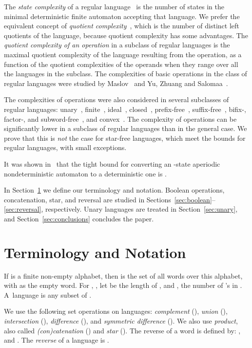 \documentclass{llncs}
\begin{document}
The \emph{state complexity} of a regular language~\cite{Yu01} is the number of states in the minimal deterministic finite automaton accepting that language. We prefer  the equivalent concept of \emph{quotient complexity}~\cite{Brz10}, which is the number of distinct left quotients of the language, because quotient complexity has some advantages.
The \emph{quotient complexity of an operation} in a subclass of regular languages is the maximal quotient complexity of the language resulting from the operation, as a function of the quotient complexities of the operands when they range over all the languages in the subclass. 
The complexities of basic operations in the class of regular languages were studied by Maslov~\cite{Mas70} and Yu, Zhuang and Salomaa~\cite{YZS94}.

The complexities of operations were also considered in several subclasses of regular languages: 
unary~\cite{PiSh02,YZS94}, finite~\cite{CCSY01,Yu01}, ideal~\cite{BJL10}, closed~\cite{BJZ10}, prefix-free~\cite{HSW09},  suffix-free~\cite{HaSa09}, bifix-, factor-, and subword-free~\cite{BJS10},   and convex~\cite{Brz10a}. 
The complexity of operations can be significantly lower 
in a subclass of regular languages than in the general case. 
We prove that this is \emph{not} the case for star-free languages, which meet the bounds for regular languages, with  small exceptions.

It was shown in~\cite{BHK09} that the tight bound for converting an -state aperiodic nondeterministic automaton to a deterministic one is .

In Section~\ref{sec:terminology} we define our terminology and notation.
Boolean operations, concatenation, star,
and reversal  are studied in Sections~\ref{sec:boolean}--\ref{sec:reversal}, respectively.
Unary languages are treated in Section~\ref{sec:unary}, and
Section~\ref{sec:conclusions} concludes the paper.

\section{Terminology and Notation}
\label{sec:terminology}
If  is a finite non-empty alphabet, then  is the set of all  words over this alphabet,
with  as the empty word. 
For , , let  be the length of , and  , the number of 's in . A~language is any subset of .


We use the following set operations on languages:  {\em complement\/} (),  {\em union\/}  (),  {\em intersection\/} (),  {\em difference\/} (), and {\em symmetric difference\/} (). 
We also  use \emph{product}, also called  \emph{(con)catenation}  ()  and   \emph{star} ().
The reverse  of a word  is defined by: , and .
The \emph{reverse} of a language  is 
.
\end{document}
